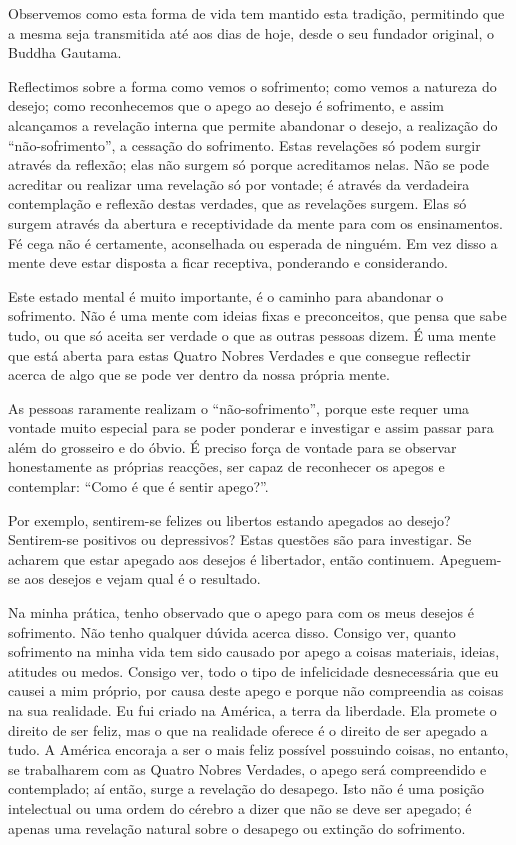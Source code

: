 Observemos como esta forma de vida tem mantido esta tradição, permitindo que a
mesma seja transmitida até aos dias de hoje, desde o seu fundador original, o
Buddha Gautama.

Reflectimos sobre a forma como vemos o sofrimento; como vemos a natureza do
desejo; como reconhecemos que o apego ao desejo é sofrimento, e assim alcançamos
a revelação interna que permite abandonar o desejo, a realização do
“não-sofrimento”, a cessação do sofrimento. Estas revelações só podem surgir
através da reflexão; elas não surgem só porque acreditamos nelas. Não se pode
acreditar ou realizar uma revelação só por vontade; é através da verdadeira
contemplação e reflexão destas verdades, que as revelações surgem. Elas só
surgem através da abertura e receptividade da mente para com os ensinamentos. Fé
cega não é certamente, aconselhada ou esperada de ninguém. Em vez disso a mente
deve estar disposta a ficar receptiva, ponderando e considerando.

Este estado mental é muito importante, é o caminho para abandonar o sofrimento.
Não é uma mente com ideias fixas e preconceitos, que pensa que sabe tudo, ou que
só aceita ser verdade o que as outras pessoas dizem. É uma mente que está aberta
para estas Quatro Nobres Verdades e que consegue reflectir acerca de algo que se
pode ver dentro da nossa própria mente.

As pessoas raramente realizam o “não-sofrimento”, porque este requer uma vontade
muito especial para se poder ponderar e investigar e assim passar para além do
grosseiro e do óbvio. É preciso força de vontade para se observar honestamente
as próprias reacções, ser capaz de reconhecer os apegos e contemplar: “Como é
que é sentir apego?”.

Por exemplo, sentirem-se felizes ou libertos estando apegados ao desejo?
Sentirem-se positivos ou depressivos? Estas questões são para investigar. Se
acharem que estar apegado aos desejos é libertador, então continuem. Apeguem-se
aos desejos e vejam qual é o resultado.

Na minha prática, tenho observado que o apego para com os meus desejos é
sofrimento. Não tenho qualquer dúvida acerca disso. Consigo ver, quanto
sofrimento na minha vida tem sido causado por apego a coisas materiais, ideias,
atitudes ou medos. Consigo ver, todo o tipo de infelicidade desnecessária que eu
causei a mim próprio, por causa deste apego e porque não compreendia as coisas
na sua realidade. Eu fui criado na América, a terra da liberdade. Ela promete o
direito de ser feliz, mas o que na realidade oferece é o direito de ser apegado
a tudo. A América encoraja a ser o mais feliz possível possuindo coisas, no
entanto, se trabalharem com as Quatro Nobres Verdades, o apego será compreendido
e contemplado; aí então, surge a revelação do desapego. Isto não é uma posição
intelectual ou uma ordem do cérebro a dizer que não se deve ser apegado; é
apenas uma revelação natural sobre o desapego ou extinção do sofrimento.

